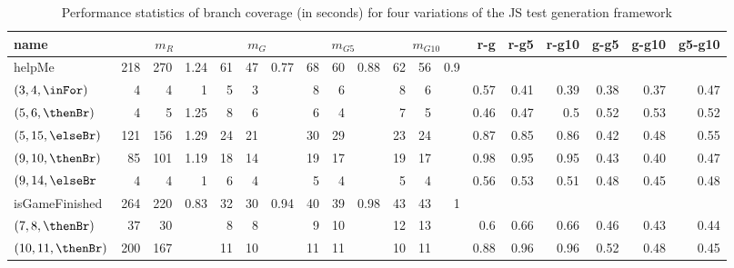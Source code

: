 \setlength\tabcolsep{0.4pt}
\begin{table}
  \caption{Performance statistics of branch coverage (in seconds) for four variations of the JS test generation framework}
  \label{tbl.stats}
    \scriptsize
    \begin{tabular}{l|rrr|rrr|rrr|rrr|rrrrrr}
      \toprule
      \textbf{name}    &  \multicolumn{3}{c|}{$m_R$}       & \multicolumn{3}{c|}{$m_G$}       & \multicolumn{3}{c|}{$m_{G5}$}       & \multicolumn{3}{c|}{$m_{G10}$}   & \textbf{r-g} & \textbf{r-g5} & \textbf{r-g10} & \textbf{g-g5} & \textbf{g-g10} & \textbf{g5-g10}\\
      \toprule
      helpMe           & 218  & 270 & 1.24               & 61 & 47 & 0.77                   & 68   & 60  & 0.88                & 62 & 56    & 0.9 &      &      &      &      &      & \\
    $(3,4,\inFor)$     & 4    & 4   & 1                  & 5  & 3  &                        & 8    & 6   &                     & 8  & 6     & & 0.57 & 0.41 & 0.39 & 0.38 & 0.37 & 0.47 \\
    $(5,6,\thenBr)$    & 4    & 5   & 1.25               & 8  & 6  &                        & 6    & 4   &                     & 7  & 5     & & 0.46 & 0.47 & 0.5  & 0.52 & 0.53 & 0.52 \\
    $(5,15,\elseBr)$   & 121  & 156 & 1.29               & 24 & 21 &                        & 30   & 29  &                     & 23 & 24    & & 0.87 & 0.85 & 0.86 & 0.42 & 0.48 & 0.55 \\
    $(9,10,\thenBr)$   & 85   & 101 & 1.19               & 18 & 14 &                        & 19   & 17  &                     & 19 & 17    & & 0.98 & 0.95 & 0.95 & 0.43 & 0.40 & 0.47 \\
    $(9,14,\elseBr$    & 4    & 4   & 1                  & 6  & 4  &                        & 5    & 4   &                     & 5  & 4     & & 0.56 & 0.53 & 0.51 & 0.48 & 0.45 & 0.48 \\
    \midrule
    isGameFinished     & 264  & 220 & 0.83               & 32 & 30 & 0.94                   & 40 & 39    & 0.98                & 43 & 43    & 1 &      &      &      &      &      &      \\
    $(7,8,\thenBr)$    & 37   & 30  &                    & 8  & 8  &                        & 9  & 10    &                     & 12 & 13    & & 0.6  & 0.66 & 0.66 & 0.46 & 0.43 & 0.44  \\
    $(10,11,\thenBr)$  & 200  & 167 &                    & 11 & 10 &                        & 11 & 11    &                     & 10 & 11    & & 0.88 & 0.96 & 0.96 & 0.52 & 0.48 & 0.45 \\

\end{tabular}
\end{table}
